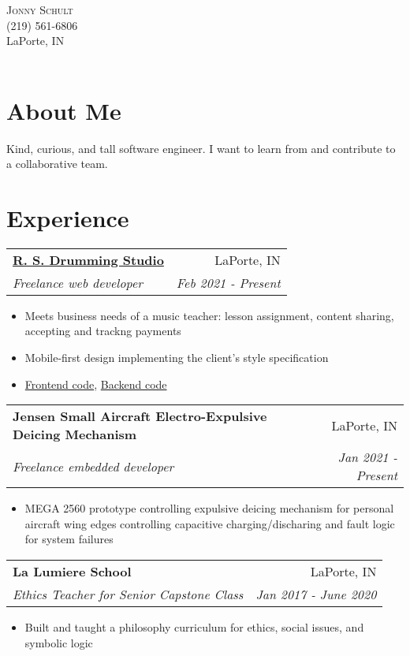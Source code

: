 \documentclass[letterpaper,11pt]{article}
\makeatletter
\newcommand{\resumeItem}[1]{
  \item\small{#1}
}
\newcommand{\resumeHeading}[4]{
    \begin{tabular*}{0.99\textwidth}[t]{l@{\extracolsep{\fill}}r}
      \textbf{#1} & #2 \\
      \textit{\small#3} & \textit{\small #4} \\
    \end{tabular*}\vspace{-5pt}
}
\newcommand{\resumeItemListStart}{\begin{itemize}}
\newcommand{\resumeItemListEnd}{\end{itemize}\vspace{-5pt}}
\makeatother
\begin{document}
\par{
    \centering
		{
            \huge \textsc{Jonny} \textsc{Schult} \\
            \normalsize (219) 561-6806 \\ LaPorte, IN \\
            \Large \color{RoyalBlue}\href{https://github.com/jonnyschult}{}
            \Large \href{mailto:jonathon.schult@gmail.com}{}
            \Large \color{RoyalBlue}\href{http://www.linkedin.com/in/jonny-schult/}{}\\
    } \bigskip \par
}

\section{About Me}
Kind, curious, and tall software engineer. I want to learn from and contribute to a collaborative team.

\section{Experience}
  \resumeHeading{\color{RoyalBlue}\href{https://www.rsdrum.com}{R. S. Drumming Studio}}{LaPorte, IN}{Freelance web developer}{Feb 2021 - Present}
      \resumeItemListStart
        \resumeItem{Meets business needs of a music teacher: lesson assignment, content sharing, accepting and trackng payments}
        \resumeItem{Mobile-first design implementing the client's style specification}
        \resumeItem{\color{RoyalBlue}\href{https://github.com/jonnyschult/rsdrumFrontend}{Frontend code}, \color{RoyalBlue}\href{https://github.com/jonnyschult/rsdrumBackend}{Backend code}}
      \resumeItemListEnd

  \resumeHeading{Jensen Small Aircraft Electro-Expulsive Deicing Mechanism}{LaPorte, IN}{Freelance embedded developer}{Jan 2021 - Present}
      \resumeItemListStart
        \resumeItem{MEGA 2560 prototype controlling expulsive deicing mechanism for personal aircraft wing edges controlling capacitive charging/discharing and fault logic for system failures}
      \resumeItemListEnd

  \resumeHeading{La Lumiere School}{LaPorte, IN}{Ethics Teacher for Senior Capstone Class}{Jan 2017 - June 2020}
      \resumeItemListStart
        \resumeItem{Built and taught a philosophy curriculum for ethics, social issues, and symbolic logic}
      \resumeItemListEnd
\end{document}
